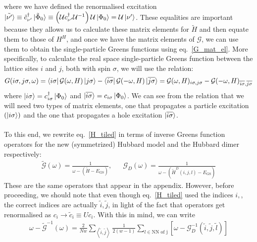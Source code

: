 \documentclass{report}
\numberwithin{equation}{section}
\begin{document}
where we have defined the renormalised excitation $\ket{\tilde {\nu^\prime}} \equiv \tilde c^\dagger_{\nu^\prime}\ket{\tilde \Phi_0} \equiv  \left(\mathcal{U} c^\dagger_{\nu^\prime}  \mathcal{U}^{-1}\right)  \mathcal{U}\ket{\Phi_0} =  \mathcal{U}\ket{{\nu^\prime}}$. These equalities are important because they allows us to calculate these matrix elements for $\tilde H$ and then equate them to those of $H^H$, and once we have the matrix elements of $\mathcal{G}$, we can use them to obtain the single-particle Greens functions using eq.~\ref{G_mat_el}. More specifically, to calculate the real space single-particle Greens function between the lattice sites $i$ and $j$, both with spin $\sigma$, we will use the relation:
\begin{equation}\begin{aligned}
	G(i\sigma, j\sigma, \omega) = \bra{ i\sigma} \mathcal{G}(\omega, H) \ket{ j\sigma} - \bra{\overline{i\sigma}} \mathcal{G}(-\omega, H) \ket{\overline {j\sigma}} = \mathcal{G}(\omega, H)_{ i\sigma, j\sigma} - \mathcal{G}(-\omega, H)_{\overline{i\sigma}, \overline {j\sigma}}
\end{aligned}\end{equation}
where $\ket{i\sigma}=c^\dagger_{i\sigma}\ket{\Phi_0}$ and $\ket{\overline{i\sigma}}=c_{i\sigma}\ket{\Phi_0}$. We can see from the relation that we will need two types of matrix elements, one that propagates a particle excitation $\left( \ket{i\sigma} \right) $ and the one that propagates a hole excitation $\ket{\overline{i\sigma}}$.
\\\\
To this end, we rewrite eq.~\ref{H_tiled} in terms of inverse Greens function operators for the new (symmetrized) Hubbard model and the Hubbard dimer respectively:
\begin{equation}\begin{aligned}
	\label{Gd_op}
	\mathcal{\tilde G}(\omega) = \frac{1}{\omega - \left(\tilde H - E_\text{GS}\right)}, && \mathcal{G}_D(\omega) = \frac{1}{\omega - \left(\tilde H^D(i,j,l) - E_\text{GS}\right)}
\end{aligned}\end{equation}
These are the same operators that appear in the appendix. However, before proceeding, we should note that even though eq.~\ref{H_tiled} used the indices $i,$, the correct indices are actually $\tilde i, \tilde j$, in light of the fact that operators get renormalised as $c_i \to \tilde c_i\equiv Uc_i$. With this in mind, we can write
\begin{equation}\begin{aligned}
	\label{green_eq}
	\omega - \mathcal{\tilde G}^{-1}(\omega) = \frac{2}{Nw}\sum_{\left<\tilde i, \tilde j\right>} \frac{1}{2(w-1)} \sum_{l \in \text{NN of j}}\left[\omega - \mathcal{G}_D^{-1}\left(\tilde i, \tilde j, \tilde l\right)\right]
\end{aligned}\end{equation}
\end{document}

